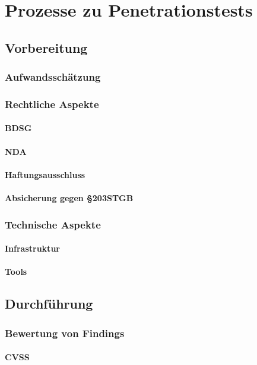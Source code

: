 \chapter{Prozesse zu Penetrationstests}
	\section{Vorbereitung}
		\subsection{Aufwandsschätzung}
		\subsection{Rechtliche Aspekte}
			\subsubsection{BDSG}
						\subsubsection{NDA}
			\subsubsection{Haftungsausschluss}
			\subsubsection{Absicherung gegen §203STGB}
		\subsection{Technische Aspekte}
			\subsubsection{Infrastruktur}
			\subsubsection{Tools}
	\section{Durchführung}
		\subsection{Bewertung von Findings}
			\subsubsection{CVSS}
